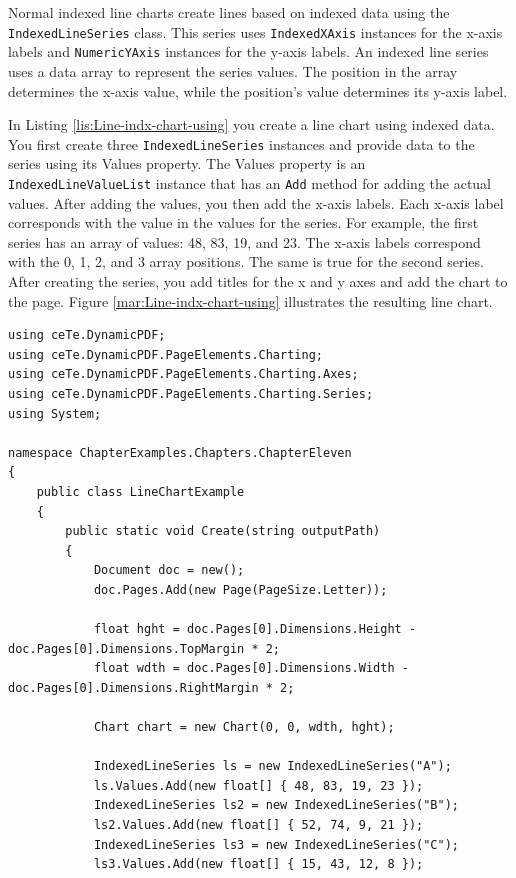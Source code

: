 \documentclass[american]{tufte-book}
\numberwithin{equation}{section}
\numberwithin{figure}{section}
\begin{document}
{Normal indexed line charts create lines based on indexed data using
the \texttt{IndexedLineSeries} class. This series uses \texttt{IndexedXAxis}
instances for the x-axis labels and \texttt{NumericYAxis} instances
for the y-axis labels. An indexed line series uses a data array to
represent the series values. The position in the array determines
the x-axis value, while the position’s value determines its y-axis
label. 

In Listing \ref{lis:Line-indx-chart-using} you create a line chart
using indexed data. You first create three \texttt{IndexedLineSeries}
instances and provide data to the series using its Values property.
The Values property is an \texttt{IndexedLineValueList} instance that
has an \texttt{Add} method for adding the actual values. After adding
the values, you then add the x-axis labels. Each x-axis label corresponds
with the value in the values for the series. For example, the first
series has an array of values: 48, 83, 19, and 23. The x-axis labels
correspond with the 0, 1, 2, and 3 array positions. The same is true
for the second series. After creating the series, you add titles for
the x and y axes and add the chart to the page. Figure \ref{mar:Line-indx-chart-using}
illustrates the resulting line chart.

\bgroup{}
\begin{lstlisting}[caption={Line chart using indexed data.},label={lis:Line-indx-chart-using},basicstyle={\footnotesize\ttfamily},breaklines=true]
using ceTe.DynamicPDF;
using ceTe.DynamicPDF.PageElements.Charting;
using ceTe.DynamicPDF.PageElements.Charting.Axes;
using ceTe.DynamicPDF.PageElements.Charting.Series;
using System;

namespace ChapterExamples.Chapters.ChapterEleven
{
    public class LineChartExample
    {
        public static void Create(string outputPath)
        {
            Document doc = new();
            doc.Pages.Add(new Page(PageSize.Letter));

            float hght = doc.Pages[0].Dimensions.Height - doc.Pages[0].Dimensions.TopMargin * 2;
            float wdth = doc.Pages[0].Dimensions.Width - doc.Pages[0].Dimensions.RightMargin * 2;

            Chart chart = new Chart(0, 0, wdth, hght);

            IndexedLineSeries ls = new IndexedLineSeries("A");
            ls.Values.Add(new float[] { 48, 83, 19, 23 });
            IndexedLineSeries ls2 = new IndexedLineSeries("B");
            ls2.Values.Add(new float[] { 52, 74, 9, 21 });
            IndexedLineSeries ls3 = new IndexedLineSeries("C");
            ls3.Values.Add(new float[] { 15, 43, 12, 8 });
                        

\end{lstlisting}}
\end{document}
